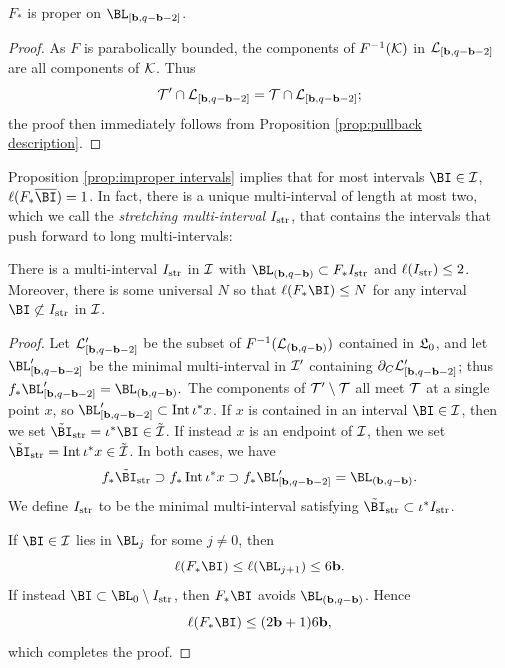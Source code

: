\documentclass[12pt]{amsart}
\begin{document}
\begin{prop}\label{prop:improper intervals}
	$F_*$ is proper on $\BL_{[\bound, q-\bound-2]}$.
\end{prop}


\begin{proof}
	As $F$ is parabolically bounded, the components of $F^{-1}(\mathcal K)$ in $\mathcal L_{[\mathbf b, q-\mathbf b-2]}$ are all components of $\mathcal K$. Thus $$\mathcal T' \cap \mathcal L_{[\mathbf b, q-\mathbf b-2]}= \mathcal T\cap \mathcal L_{[\mathbf b, q-\mathbf b-2]};$$
	the proof then immediately follows from Proposition \ref{prop:pullback description}.
\end{proof}


Proposition \ref{prop:improper intervals} implies that for most intervals $\BI\in \II$, $\ell(F_*\overline\BI)=1$. 
In fact, 
there is a unique multi-interval of length at most two, which we call the \emph{stretching multi-interval} $I_{\mathrm{str}}$, that contains the intervals that push forward to long multi-intervals:


\begin{prop}\label{prop:stretching interval}
	There is a multi-interval $I_{\mathrm{str}}$ in $\mathcal I$ with  $\BL_{(\bound, q-\bound)}\subset F_*I_\str$ and $\ell(I_{\mathrm{str}})\leq 2$. Moreover, there is some universal $N$ so that 
	$\ell(F_* \BI)\leq N$ for any  interval $\BI\not\subset I_\str$ in $\mathcal I$.
\end{prop}


\begin{proof}
	Let $\mathcal L_{[\mathbf b, q-\mathbf b-2]}'$ be the subset of $F^{-1}(\mathcal L_{(\mathbf b, q-\mathbf b)})$ contained in $\mathfrak{L}_0$, and let
	$\BL_{[\bound, q-\bound-2]}'$ 
	be the minimal multi-interval in $\mathcal I'$ containing $\partial_C \mathcal L_{[\mathbf b, q-\mathbf b-2]}'$; thus $f_*\BL_{[\bound, q-\bound-2]}'=\BL_{(\bound, q-\bound)}.$ The components of $\mathcal T'\setminus \mathcal T$ all meet $\mathcal T$ at a single point $x$, so $\BL_{[\bound, q-\bound-2]}'\subset \Int\iota^*x$. If $x$ is contained in an interval $\BI\in \II$, then we set $\tilde \BI_\str = \iota^*\BI\in \tilde \II$. 
	If instead $x$ is an endpoint of $\mathcal I$, then we set $\tilde \BI_\str = \Int\iota^*x \in \tilde \II$. In both cases, we have 
	$$f_*\tilde \BI_\str\supset f_*\Int \iota^*x \supset f_*\BL_{[\bound, q-\bound-2]}' = \BL_{(\bound, q-\bound)}.$$
	We define $I_{\mathrm{str}}$ to be the minimal multi-interval satisfying $\tilde \BI_\str\subset \iota^*I_\str$. 
	
	
	If $\BI\in \II$ lies in $\BL_j$ for some $j\neq 0$, then 
	$$\ell(F_* \BI)\leq \ell(\BL_{j+1})\leq 6\bound.$$
	If  instead $\BI\subset \BL_0\sm I_\str$, then $F_* \BI$ avoids $\BL_{(\bound, q-\bound)}$.  Hence 
	$$\ell(F_* \BI)\leq (2\bound +1)6\bound,$$
	which completes the proof.
\end{proof}
\end{document}
